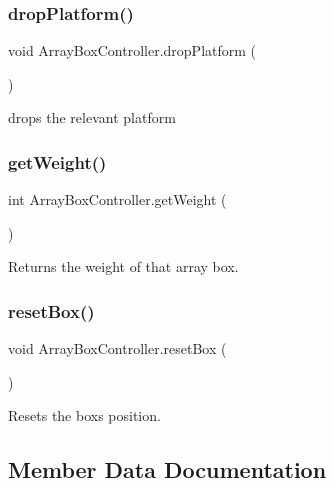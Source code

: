 \subsubsection{\texorpdfstring{drop\+Platform()}{dropPlatform()}}
{\footnotesize\ttfamily void Array\+Box\+Controller.\+drop\+Platform (\begin{DoxyParamCaption}{ }\end{DoxyParamCaption})}



drops the relevant platform 

\mbox{\label{class_array_box_controller_aca5b840fdc879a3268c9a57a439d6172}} 
\subsubsection{\texorpdfstring{get\+Weight()}{getWeight()}}
{\footnotesize\ttfamily int Array\+Box\+Controller.\+get\+Weight (\begin{DoxyParamCaption}{ }\end{DoxyParamCaption})}



Returns the weight of that array box. 

\mbox{\label{class_array_box_controller_a457e96d6ccf856144d580f392dcc17e8}} 
\subsubsection{\texorpdfstring{reset\+Box()}{resetBox()}}
{\footnotesize\ttfamily void Array\+Box\+Controller.\+reset\+Box (\begin{DoxyParamCaption}{ }\end{DoxyParamCaption})}



Resets the boxs position. 



\subsection{Member Data Documentation}
\mbox{\label{class_array_box_controller_af7f266ad7922670c221e4a2247308f03}} 
